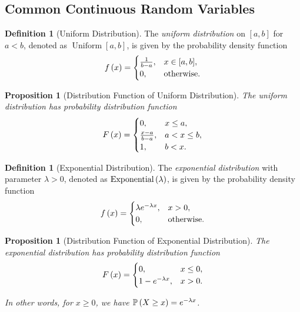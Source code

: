 \documentclass{article}
\newtheorem{proposition}[theorem]{Proposition}
\theoremstyle{definition}
\newtheorem{definition}[theorem]{Definition}
\theoremstyle{remark}
\newcommand{\Prob}{\mathbb{P}}
\newcommand{\ccintv}[2]{[#1,#2]}
\newcommand{\Uniform}{\operatorname{Uniform}}
\newcommand{\Exponential}{\operatorname{Exponential}}
\begin{document}
\subsection{Common Continuous Random Variables}

\begin{definition}[Uniform Distribution]
    \label{def:uniform-distribution}%
    The \emph{uniform distribution} on \(\ccintv{a}{b}\) for \(a < b\), denoted as \(\Uniform\ccintv{a}{b}\), is given by the probability density function
    \[
        f\pqty{x} = \begin{cases}
            \frac{1}{b - a}, & x \in \ccintv{a}{b}, \\
            0, & \text{otherwise}.
        \end{cases}
    \]
\end{definition}

\begin{proposition}[Distribution Function of Uniform Distribution]
    \label{prop:cdf-uniform}%
    The uniform distribution has probability distribution function
    \[
        F\left(x\right) = \begin{cases}
            0, & x \leq a, \\
            \frac{x - a}{b - a}, & a < x \leq b, \\
            1, & b < x.
        \end{cases}
    \]
\end{proposition}

\begin{definition}[Exponential Distribution]
    \label{def:exponential-distribution}%
    The \emph{exponential distribution} with parameter \(\lambda > 0\), denoted as \(\Exponential\pqty{\lambda}\), is given by the probability density function
    \[
        f\left(x\right) = \begin{cases}
            \lambda e^{-\lambda x}, & x > 0, \\
            0, & \text{otherwise}.
        \end{cases}
    \]
\end{definition}

\begin{proposition}[Distribution Function of Exponential Distribution]
    \label{prop:cdf-exponential}%
    The exponential distribution has probability distribution function
    \[
        F\left(x\right) = \begin{cases}
            0, & x \leq 0, \\
            1-  e^{-\lambda x}, & x > 0.
        \end{cases}
    \]

    In other words, for \(x \geq 0\), we have \(\Prob\pqty{X \geq x} = e^{-\lambda x}\).
\end{proposition}
\end{document}
